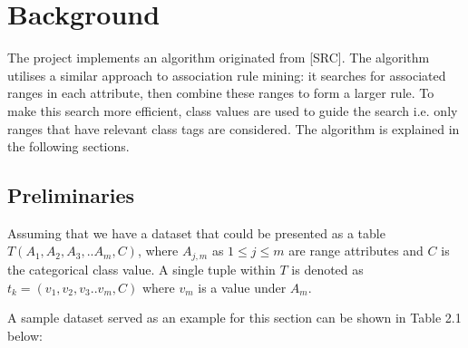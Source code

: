 \chapter{Background}

The project implements an algorithm originated from [SRC]. The algorithm utilises a similar approach to association rule mining: it searches for associated ranges in each attribute, then combine these ranges to form a larger rule. To make this search more efficient, class values are used to guide the search i.e. only ranges that have relevant class tags are considered. The algorithm is explained in the following sections.

\section{Preliminaries}

Assuming that we have a dataset that could be presented as a table $T(A_1, A_2, A_3,..A_m, C)$, where $A_{j,m}$ as $1 \leq j \leq m$ are range attributes and $C$ is the categorical class value. A single tuple within $T$ is denoted as $t_k = (v_1,v_2,v_3..v_m,C)$ where $v_m$ is a value under $A_m$.

A sample dataset served as an example for this section can be shown in Table 2.1 below: 

 

